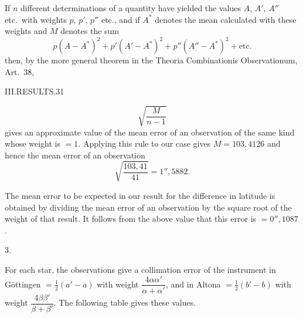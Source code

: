 If $n$ different determinations of a quantity have yielded the values $A$, $A'$, $A''$
etc.\ with weights $p$, $p'$, $p''$ etc., and if $A^\ast$ denotes the mean calculated
with these weights and $M$ denotes the sum
\[
p(A-A^\ast)^2+p'(A'-A^\ast)^2+p''(A''-A^\ast)^2+\text{etc.}
\]
then, by the more general theorem in the Theoria Combinationis
Observationum, Art.\ 38,

\clearpage
\noindent\mbox{}\hfill III.\quad RESULTS.\hfill 31\par
\[
\sqrt{\frac{M}{n-1}}
\]
gives an approximate value of the mean error of an observation of the same
kind whose weight is $=1$. Applying this rule to
our case gives $M=103{,}4126$ and hence the mean error of an observation
\[
\sqrt{\frac{103{,}41}{41}}=1''{,}5882.
\]

The mean error to be expected in our result for the difference in latitude
is obtained by dividing the mean error of an observation
by the square root of the weight of that result. It follows from the above
value that this error is $=0''{,}1087$.

\begin{center}3.\end{center}

For each star, the observations give a collimation error of the instrument
in Göttingen $=\frac12(a'-a)$ with weight $\dfrac{4\alpha\alpha'}{\alpha+\alpha'}$, and in
Altona $=\frac12(b'-b)$ with weight $\dfrac{4\beta\beta'}{\beta+\beta'}$. The following table gives these
values.

